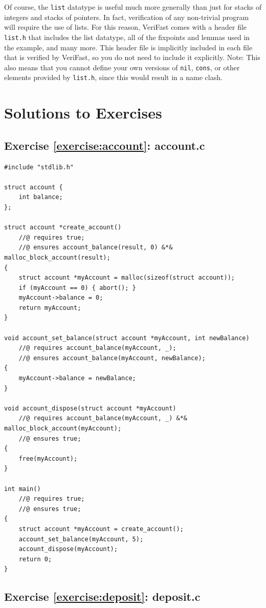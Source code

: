 \documentclass{article}
\begin{document}
Of course, the \lstinline!list! datatype is useful much more
generally than just for stacks of integers and stacks of
pointers. In fact, verification of any non-trivial program will
require the use of lists. For this reason, VeriFast comes with
a header file \verb|list.h| that includes the list datatype,
all of the fixpoints and lemmas used in the example, and many
more. This header file is implicitly included in each file that
is verified by VeriFast, so you do not need to include it
explicitly. Note: This also means that you cannot define your
own versions of \lstinline!nil!, \lstinline!cons!, or other
elements provided by \verb|list.h|, since this would result in
a name clash.

\section{Solutions to Exercises}

\subsection{Exercise \ref{exercise:account}: account.c}

\begin{lstlisting}
#include "stdlib.h"

struct account {
    int balance;
};

struct account *create_account()
    //@ requires true;
    //@ ensures account_balance(result, 0) &*& malloc_block_account(result);
{
    struct account *myAccount = malloc(sizeof(struct account));
    if (myAccount == 0) { abort(); }
    myAccount->balance = 0;
    return myAccount;
}

void account_set_balance(struct account *myAccount, int newBalance)
    //@ requires account_balance(myAccount, _);
    //@ ensures account_balance(myAccount, newBalance);
{
    myAccount->balance = newBalance;
}

void account_dispose(struct account *myAccount)
    //@ requires account_balance(myAccount, _) &*& malloc_block_account(myAccount);
    //@ ensures true;
{
    free(myAccount);
}

int main()
    //@ requires true;
    //@ ensures true;
{
    struct account *myAccount = create_account();
    account_set_balance(myAccount, 5);
    account_dispose(myAccount);
    return 0;
}
\end{lstlisting}

\subsection{Exercise \ref{exercise:deposit}: deposit.c}
\end{document}
